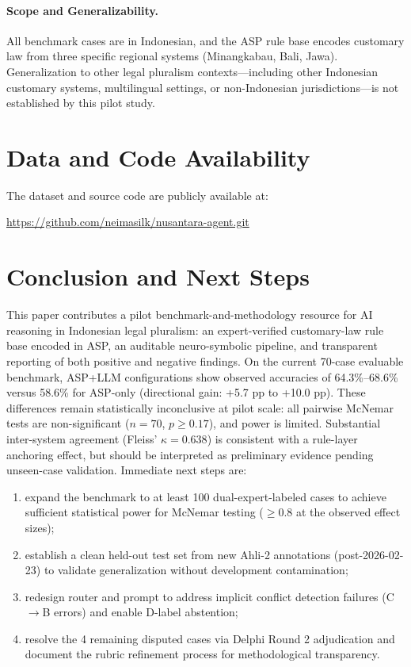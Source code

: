 \documentclass[11pt]{article}
\begin{document}
\paragraph{Scope and Generalizability.}
All benchmark cases are in Indonesian, and the ASP rule base encodes customary law from three specific regional systems (Minangkabau, Bali, Jawa). Generalization to other legal pluralism contexts---including other Indonesian customary systems, multilingual settings, or non-Indonesian jurisdictions---is not established by this pilot study.

\section{Data and Code Availability}
The dataset and source code are publicly available at:
\begin{center}
\url{https://github.com/neimasilk/nusantara-agent.git}
\end{center}

\section{Conclusion and Next Steps}
This paper contributes a pilot benchmark-and-methodology resource for AI reasoning in Indonesian legal pluralism: an expert-verified customary-law rule base encoded in ASP, an auditable neuro-symbolic pipeline, and transparent reporting of both positive and negative findings.
On the current 70-case evaluable benchmark, ASP+LLM configurations show observed accuracies of 64.3\%--68.6\% versus 58.6\% for ASP-only (directional gain: +5.7 pp to +10.0 pp).
These differences remain statistically inconclusive at pilot scale: all pairwise McNemar tests are non-significant ($n=70$, $p \geq 0.17$), and power is limited.
Substantial inter-system agreement (Fleiss' $\kappa = 0.638$) is consistent with a rule-layer anchoring effect, but should be interpreted as preliminary evidence pending unseen-case validation.
Immediate next steps are:
\begin{enumerate}[nosep]
    \item expand the benchmark to at least 100 dual-expert-labeled cases to
          achieve sufficient statistical power for McNemar testing ($\geq$0.8
          at the observed effect sizes);
    \item establish a clean held-out test set from new Ahli-2 annotations
          (post-2026-02-23) to validate generalization without development
          contamination;
    \item redesign router and prompt to address implicit conflict detection
          failures (C$\rightarrow$B errors) and enable D-label abstention;
    \item resolve the 4 remaining disputed cases via Delphi Round 2
          adjudication and document the rubric refinement process for
          methodological transparency.
\end{enumerate}



\end{document}
